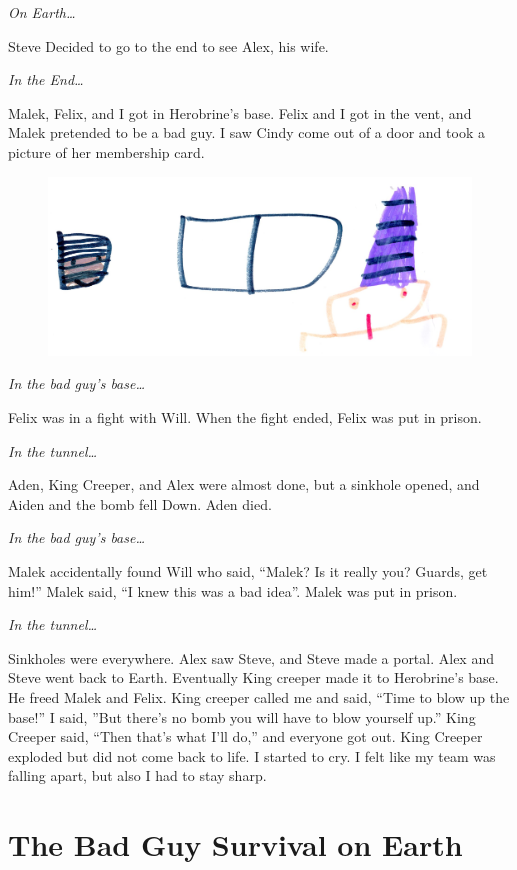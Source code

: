 \documentclass[12pt,oneside]{krantz}
\begin{document}
\emph{On Earth\ldots{}}

Steve Decided to go to the end to see Alex, his wife.

\emph{In the End\ldots{}}

Malek, Felix, and I got in Herobrine's base. Felix and I got in the
vent, and Malek pretended to be a bad guy. I saw Cindy come out of a
door and took a picture of her membership card.

\begin{figure}
\centering
\includegraphics[width=6.25000in]{img/7-door.jpg}
\caption{}
\end{figure}

\emph{In the bad guy's base\ldots{}}

Felix was in a fight with Will. When the fight ended, Felix was put in
prison.

\emph{In the tunnel\ldots{}}

Aden, King Creeper, and Alex were almost done, but a sinkhole opened,
and Aiden and the bomb fell Down. Aden died.

\emph{In the bad guy's base\ldots{}}

Malek accidentally found Will who said, ``Malek? Is it really you?
Guards, get him!'' Malek said, ``I knew this was a bad idea''. Malek was
put in prison.

\emph{In the tunnel\ldots{}}

Sinkholes were everywhere. Alex saw Steve, and Steve made a portal. Alex
and Steve went back to Earth. Eventually King creeper made it to
Herobrine's base. He freed Malek and Felix. King creeper called me and
said, ``Time to blow up the base!'' I said, ''But there's no bomb you
will have to blow yourself up.'' King Creeper said, ``Then that's what
I'll do,'' and everyone got out. King Creeper exploded but did not come
back to life. I started to cry. I felt like my team was falling apart,
but also I had to stay sharp.

\chapter{The Bad Guy Survival on
Earth}\label{the-bad-guy-survival-on-earth}
\end{document}
